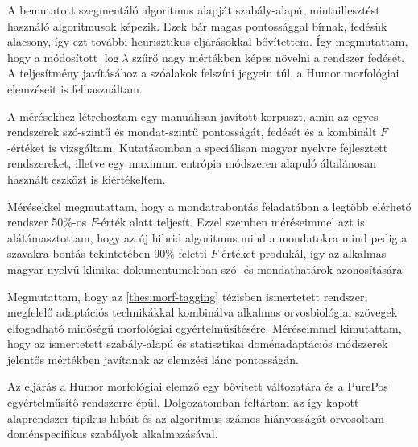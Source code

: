 A bemutatott szegmentáló algoritmus alapját szabály-alapú, mintaillesztést használó algoritmusok képezik. 
Ezek bár magas pontossággal bírnak, fedésük alacsony, így ezt további heurisztikus eljárásokkal bővítettem.
Így megmutattam, hogy a módosított $\log \lambda$ szűrő nagy mértékben képes növelni a rendszer fedését. 
A teljesítmény javításához a szóalakok felszíni jegyein túl, a Humor morfológiai elemzéseit is felhasználtam.

A mérésekhez létrehoztam egy manuálisan javított korpuszt, amin az egyes rendszerek szó-szintű és mondat-szintű pontosságát, fedését és a kombinált $F$-értéket is vizsgáltam.  
Kutatásomban a speciálisan magyar nyelvre fejlesztett rendszereket, illetve egy maximum entrópia módszeren alapuló általánosan használt eszközt is kiértékeltem.

Mérésekkel megmutattam, hogy a mondatrabontás feladatában a legtöbb elérhető rendszer 50\%-os $F$-érték alatt teljesít. 
Ezzel szemben méréseimmel azt is alátámasztottam, hogy az új hibrid algoritmus mind a mondatokra mind pedig a szavakra bontás tekintetében 90\% feletti $F$ értéket produkál, így az alkalmas 
magyar nyelvű klinikai dokumentumokban szó- és mondathatárok azonosítására.

\thesisline%

\begin{core}
\begin{thesis}%
\label{thes:clin-pos}
Megmutattam, hogy az \ref{thes:morf-tagging} tézisben ismertetett rendszer, megfelelő adaptációs technikákkal kombinálva alkalmas orvosbiológiai szövegek elfogadható minőségű morfológiai egyértelműsítésére. 
Méréseimmel kimutattam, hogy az ismertetett szabály-alapú és statisztikai doménadaptációs módszerek jelentős mértékben javítanak az elemzési lánc pontosságán.
\end{thesis}

\begin{pub}
\cite{Orosz2013,Orosz2014b} 
\end{pub}
\end{core}

Az eljárás a Humor morfológiai elemző egy bővített változatára és a PurePos egyértelműsítő rendszerre épül. 
Dolgozatomban feltártam az így kapott alaprendszer tipikus hibáit és az algoritmus számos hiányosságát orvosoltam doménspecifikus szabályok alkalmazásával. 

